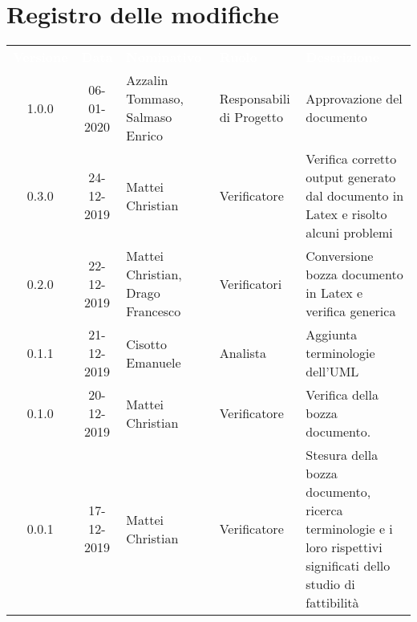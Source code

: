 \section*{Registro delle modifiche}
{
\renewcommand{\arraystretch}{1.5}
\centering
\begin{longtable}{ c c  C{4cm}  C{3cm} C{4cm}}
\textcolor{white}{\textbf{Versione}} & \textcolor{white}{\textbf{Data}} & \textcolor{white}{\textbf{Nominativo}} & \textcolor{white}{\textbf{Ruolo}} & \textcolor{white}{\textbf{Descrizione}}\\	


1.0.0 & 06-01-2020 & Azzalin Tommaso, Salmaso Enrico & Responsabili di Progetto & Approvazione del documento \\

0.3.0 & 24-12-2019 & Mattei Christian & Verificatore & Verifica corretto output generato dal documento in Latex e risolto alcuni problemi\\

0.2.0 & 22-12-2019 & Mattei Christian, Drago Francesco & Verificatori &  Conversione bozza documento in Latex e verifica generica\\

0.1.1 & 21-12-2019 & Cisotto Emanuele & Analista & Aggiunta terminologie dell'UML \\
		
0.1.0 & 20-12-2019 & Mattei Christian & Verificatore & Verifica della bozza documento.  \\
		
0.0.1 & 17-12-2019 & Mattei Christian & Verificatore & Stesura della bozza documento, ricerca terminologie e i loro rispettivi significati dello studio di fattibilità \\
		
		
\end{longtable}
}